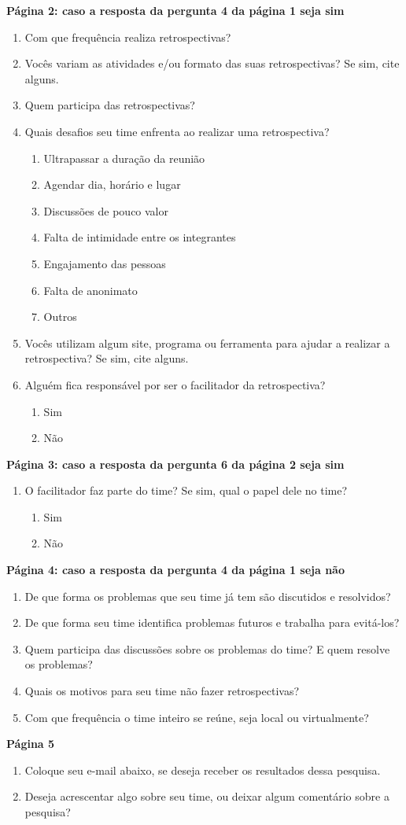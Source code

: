 \textbf{Página 2: caso a resposta da pergunta 4 da página 1 seja sim}
\begin{enumerate}
	\item Com que frequência realiza retrospectivas?
	\item Vocês variam as atividades e/ou formato das suas retrospectivas? Se sim, cite alguns.
	\item Quem participa das retrospectivas?
	\item Quais desafios seu time enfrenta ao realizar uma retrospectiva? 
	\begin{enumerate}
		\item Ultrapassar a duração da reunião
		\item Agendar dia, horário e lugar
		\item Discussões de pouco valor 
		\item Falta de intimidade entre os integrantes 
		\item Engajamento das pessoas 
		\item Falta de anonimato 
		\item Outros 
	\end{enumerate}
	\item Vocês utilizam algum site, programa ou ferramenta para ajudar a realizar a retrospectiva? Se sim, cite alguns. 
	\item Alguém fica responsável por ser o facilitador da retrospectiva?
	\begin{enumerate}
		\item Sim 
		\item Não
	\end{enumerate}
\end{enumerate}

\textbf{Página 3: caso a resposta da pergunta 6 da página 2 seja sim}
\begin{enumerate}
	\item O facilitador faz parte do time? Se sim, qual o papel dele no time?
	\begin{enumerate}
		\item Sim
		\item Não
	\end{enumerate}
\end{enumerate}

\textbf{Página 4: caso a resposta da pergunta 4 da página 1 seja não}
\begin{enumerate}
	\item De que forma os problemas que seu time já tem são discutidos e resolvidos? 
	\item De que forma seu time identifica problemas futuros e trabalha para evitá-los? 
	\item Quem participa das discussões sobre os problemas do time? E quem resolve os problemas? 
	\item Quais os motivos para seu time não fazer retrospectivas? 
	\item Com que frequência o time inteiro se reúne, seja local ou virtualmente?
\end{enumerate}

\textbf{Página 5}
\begin{enumerate}
	\item Coloque seu e-mail abaixo, se deseja receber os resultados dessa pesquisa. 
	\item Deseja acrescentar algo sobre seu time, ou deixar algum comentário sobre a pesquisa?
\end{enumerate}